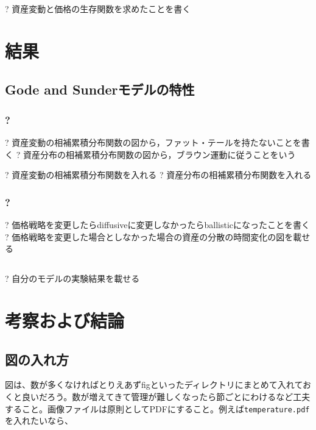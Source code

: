 \documentclass[titlepage]{jsreport}
\begin{document}
? 資産変動と価格の生存関数を求めたことを書く


\chapter{結果} \label{chap:results}
\section{Gode and Sunderモデルの特性}
\subsection{? }
? 資産変動の相補累積分布関数の図から，ファット・テールを持たないことを書く
? 資産分布の相補累積分布関数の図から，ブラウン運動に従うことをいう

? 資産変動の相補累積分布関数を入れる
? 資産分布の相補累積分布関数を入れる

\subsection{?}
? 価格戦略を変更したらdiffusiveに変更しなかったらballisticになったことを書く
? 価格戦略を変更した場合としなかった場合の資産の分散の時間変化の図を載せる

\section{}
? 自分のモデルの実験結果を載せる

\chapter{考察および結論} \label{chap:summary}

\section{図の入れ方}
図は、数が多くなければとりえあずfigといったディレクトリにまとめて入れておくと良いだろう。数が増えてきて管理が難しくなったら節ごとにわけるなど工夫すること。画像ファイルは原則としてPDFにすること。例えば\verb|temperature.pdf|を入れたいなら、
\end{document}
